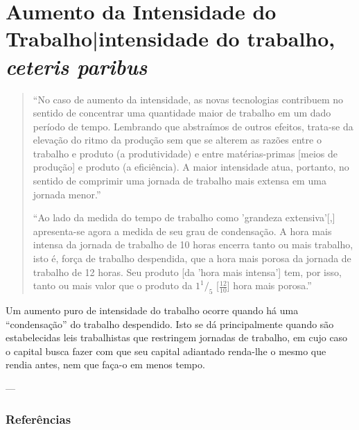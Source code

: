 \section{Aumento da Intensidade do Trabalho|intensidade do trabalho, \textit{ceteris paribus}}
\begin{quote}
``No caso de aumento da intensidade, as novas tecnologias contribuem no sentido de concentrar uma quantidade maior de trabalho em um dado período de tempo. Lembrando que abstraímos de outros efeitos, trata-se da elevação do ritmo da produção sem que se alterem as razões entre o trabalho e produto (a produtividade) e entre matérias-primas [meios de produção] e produto (a eficiência). A maior intensidade atua, portanto, no sentido de comprimir uma jornada de trabalho mais extensa em uma jornada menor.'' \parencite[p. 234]{SaBarreto2021a}

``Ao lado da medida do tempo de trabalho como 'grandeza extensiva'[,] apresenta-se agora a medida de seu grau de condensação. A hora mais intensa da jornada de trabalho de 10 horas encerra tanto ou mais trabalho, isto é, força de trabalho despendida, que a hora mais porosa da jornada de trabalho de 12 horas. Seu produto [da 'hora mais intensa'] tem, por isso, tanto ou mais valor que o produto da $1 ^1/_{5}$ [$\frac{12}{10}$] hora mais porosa.'' \parencite[p. 482-3]{Marx2017}
\end{quote}

Um aumento puro de intensidade do trabalho ocorre quando há uma ``condensação'' do trabalho despendido. Isto se dá principalmente quando são estabelecidas leis trabalhistas que restringem jornadas de trabalho, em cujo caso o capital busca fazer com que seu capital adiantado renda-lhe o mesmo que rendia antes, nem que faça-o em menos tempo.

---
\subsubsection{Referências}
